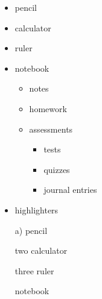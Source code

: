 \documentclass[11pt]{article}
\begin{document}
\vspace{1cm}

\begin{itemize}
\item pencil
\item calculator
\item ruler
\item notebook
	\begin{itemize}
	\item notes
	\item homework
	\item assessments
		\begin{itemize}
		\item tests
		\item quizzes
		\item journal entries
		\end{itemize}
	\end{itemize}
\item highlighters
\end{itemize}

\vspace{1cm}

\begin{enumerate}
\item[a)] pencil
\item[two] calculator
\item[three] ruler
\item[] notebook
\end{enumerate}
\end{document}
